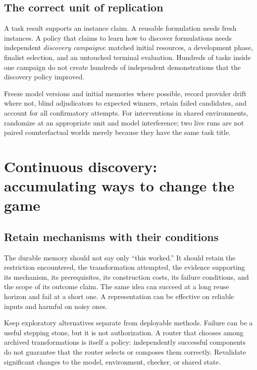 \documentclass[11pt,letterpaper]{article}
\theoremstyle{remark}\newtheorem{remark}{Remark}[section]
\begin{document}
\subsection{The correct unit of replication}
A task result supports an instance claim. A reusable formulation needs fresh instances. A policy that claims to learn how to discover formulations needs independent \emph{discovery campaigns}: matched initial resources, a development phase, finalist selection, and an untouched terminal evaluation. Hundreds of tasks inside one campaign do not create hundreds of independent demonstrations that the discovery policy improved.

Freeze model versions and initial memories where possible, record provider drift where not, blind adjudicators to expected winners, retain failed candidates, and account for all confirmatory attempts. For interventions in shared environments, randomize at an appropriate unit and model interference; two live runs are not paired counterfactual worlds merely because they have the same task title.

\section{Continuous discovery: accumulating ways to change the game}
\label{sec:continuous}
\subsection{Retain mechanisms with their conditions}
The durable memory should not say only ``this worked.'' It should retain the restriction encountered, the transformation attempted, the evidence supporting its mechanism, its prerequisites, its construction costs, its failure conditions, and the scope of its outcome claim. The same idea can succeed at a long reuse horizon and fail at a short one. A representation can be effective on reliable inputs and harmful on noisy ones.

Keep exploratory alternatives separate from deployable methods. Failure can be a useful stepping stone, but it is not authorization. A router that chooses among archived transformations is itself a policy: independently successful components do not guarantee that the router selects or composes them correctly. Revalidate significant changes to the model, environment, checker, or shared state.
\end{document}
